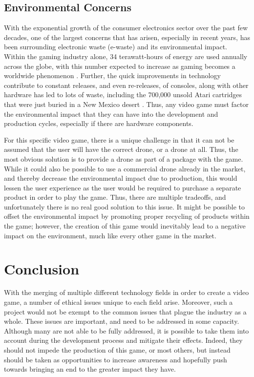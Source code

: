 \documentclass[10pt,twocolumn]{article}
\begin{document}
\subsection{Environmental Concerns}
With the exponential growth of the consumer electronics sector over the past few decades, one of the largest concerns that has arisen, especially in recent years, has been surrounding electronic waste (e-waste) and its environmental impact. Within the gaming industry alone, 34 terawatt-hours of energy are used annually across the globe, with this number expected to increase as gaming becomes a worldwide phenomenon \cite{GamingEWaste}. Further, the quick improvements in technology contribute to constant releases, and even re-releases, of consoles, along with other hardware has led to lots of waste, including the 700,000 unsold Atari cartridges that were just buried in a New Mexico desert \cite{GamingEWaste}. Thus, any video game must factor the environmental impact that they can have into the development and production cycles, especially if there are hardware components. 

For this specific video game, there is a unique challenge in that it can not be assumed that the user will have the correct drone, or a drone at all. Thus, the most obvious solution is to provide a drone as part of a package with the game. While it could also be possible to use a commercial drone already in the market, and thereby decrease the environmental impact due to production, this would lessen the user experience as the user would be required to purchase a separate product in order to play the game. Thus, there are multiple tradeoffs, and unfortunately there is no real good solution to this issue. It might be possible to offset the environmental impact by promoting proper recycling of products within the game; however, the creation of this game would inevitably lead to a negative impact on the environment, much like every other game in the market.

\section{Conclusion}
With the merging of multiple different technology fields in order to create a video game, a number of ethical issues unique to each field arise. Moreover, such a project would not be exempt to the common issues that plague the industry as a whole. These issues are important, and need to be addressed in some capacity. Although many are not able to be fully addressed, it is possible to take them into account during the development process and mitigate their effects. Indeed, they should not impede the production of this game, or most others, but instead should be taken as opportunities to increase awareness and hopefully push towards bringing an end to the greater impact they have.

\printbibliography 
\end{document}
